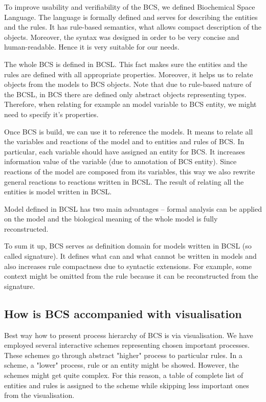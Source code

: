 \documentclass[12pt]{fithesis2}
\begin{document}
To improve usability and verifiability of the BCS, we defined Biochemical Space Language. The language is formally defined and serves for describing the entities and the rules. It has rule-based semantics, what allows compact description of the objects. Moreover, the syntax was designed in order to be very concise and human-readable. Hence it is very suitable for our needs.

The whole BCS is defined in BCSL. This fact makes sure the entities and the rules are defined with all appropriate properties. Moreover, it helps us to relate objects from the models to BCS objects. Note that due to rule-based nature of the BCSL, in BCS there are defined only abstract objects representing types. Therefore, when relating for example an model variable to BCS entity, we might need to specify it's properties. 

Once BCS is build, we can use it to reference the models. It means to relate all the variables and reactions of the model and to entities and rules of BCS. In particular, each variable should have assigned an entity for BCS. It increases information value of the variable (due to annotation of BCS entity). Since reactions of the model are composed from its variables, this way we also rewrite general reactions to reactions written in BCSL. The result of relating all the entities is model written in BCSL. 

Model defined in BCSL has two main advantages -- formal analysis can be applied on the model and the biological meaning of the whole model is fully reconstructed.

To sum it up, BCS serves as definition domain for models written in BCSL (so called signature). It defines what can and what cannot be written in models and also increases rule compactness due to syntactic extensions. For example, some context might be omitted from the rule because it can be reconstructed from the signature.


\subsection{How is BCS accompanied with visualisation}

Best way how to present process hierarchy of BCS is via visualisation. We have employed several interactive schemes representing chosen important processes. These schemes go through abstract "higher" process to particular rules. In a scheme, a "lower" process, rule or an entity might be showed. However, the schemes might get quite complex. For this reason, a table of complete list of entities and rules is assigned to the scheme while skipping less important ones from the visualisation.
\end{document}
